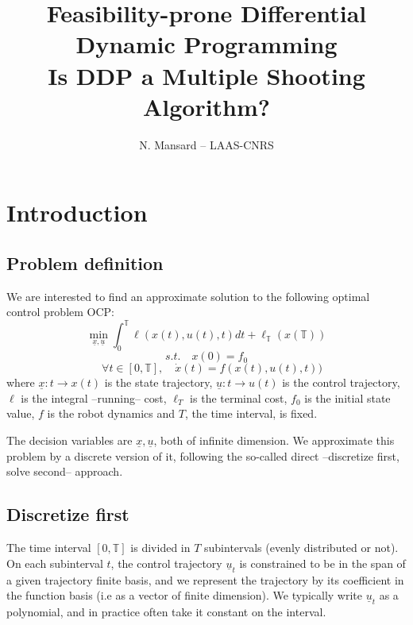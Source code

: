 \documentclass[10pt,a4paper]{article}
\begin{document}
\title{Feasibility-prone Differential Dynamic Programming \\
Is DDP a Multiple Shooting Algorithm?}
\author{N. Mansard -- LAAS-CNRS}

\maketitle


\newcommand{\xtraj}{\underline{x}}
\newcommand{\utraj}{\underline{u}}
\newcommand{\lambdatraj}{\underline{\lambda}}
\newcommand{\dxtraj}{\underline{\Delta x}}
\newcommand{\dutraj}{\underline{\Delta u}}
\newcommand{\dxtrajguess}{\underline{\Delta \bar x}}
\newcommand{\dutrajguess}{\underline{\Delta \bar u}}
\newcommand{\dx}{\Delta x}
\newcommand{\du}{\Delta u}
\newcommand{\Treal}{\mathbb{T}}
\newcommand{\bmat}{\begin{bmatrix}}
\newcommand{\emat}{\end{bmatrix}}
\newcommand{\qed}{\hfill$\square$}

\section{Introduction}

\subsection{Problem definition}
We are interested to find an approximate solution to the following optimal control problem OCP:
$$\min_{\xtraj,\utraj} \int_0^\Treal \ell(x(t),u(t),t) dt + \ell_\Treal(x(\Treal))$$
$$s.t. \quad x(0) = f_0$$
$$\quad \forall t \in [0,\Treal], \quad \dot{x}(t) = f(x(t),u(t),t))$$
where $\xtraj: t \rightarrow x(t)$ is the state trajectory, $\utraj: t \rightarrow u(t)$ is the control trajectory, $\ell$ is the integral --running-- cost, $\ell_T$ is the terminal cost, $f_0$ is the initial state value, $f$ is the robot dynamics and $T$, the time interval, is fixed.

The decision variables are $\xtraj,\utraj$, both of infinite dimension. 
We approximate this problem by a discrete version of it, following the so-called direct --discretize first, solve second-- approach.

\subsection{Discretize first}
The time interval $[0,\Treal]$ is divided in $T$ subintervals (evenly distributed or not).
On each subinterval $t$, the control trajectory $\utraj_t$ is constrained to be in the span of a given trajectory finite basis, and we represent the trajectory by its coefficient in the function basis (i.e as a vector of finite dimension). We typically write $\utraj_t$ as a polynomial, and in practice often take it constant on the interval.
\end{document}
